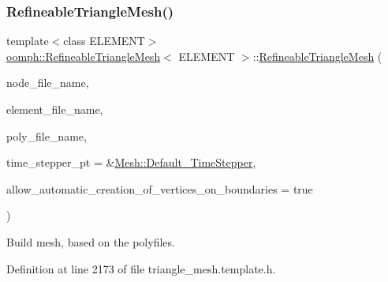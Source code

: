 \subsubsection{\texorpdfstring{Refineable\+Triangle\+Mesh()}{RefineableTriangleMesh()}\hspace{0.1cm}{\footnotesize\ttfamily [2/3]}}
{\footnotesize\ttfamily template$<$class E\+L\+E\+M\+E\+NT$>$ \\
\hyperlink{classoomph_1_1RefineableTriangleMesh}{oomph\+::\+Refineable\+Triangle\+Mesh}$<$ E\+L\+E\+M\+E\+NT $>$\+::\hyperlink{classoomph_1_1RefineableTriangleMesh}{Refineable\+Triangle\+Mesh} (\begin{DoxyParamCaption}\item[{const std\+::string \&}]{node\+\_\+file\+\_\+name,  }\item[{const std\+::string \&}]{element\+\_\+file\+\_\+name,  }\item[{const std\+::string \&}]{poly\+\_\+file\+\_\+name,  }\item[{\hyperlink{classoomph_1_1TimeStepper}{Time\+Stepper} $\ast$}]{time\+\_\+stepper\+\_\+pt = {\ttfamily \&\hyperlink{classoomph_1_1Mesh_a12243d0fee2b1fcee729ee5a4777ea10}{Mesh\+::\+Default\+\_\+\+Time\+Stepper}},  }\item[{const bool \&}]{allow\+\_\+automatic\+\_\+creation\+\_\+of\+\_\+vertices\+\_\+on\+\_\+boundaries = {\ttfamily true} }\end{DoxyParamCaption})\hspace{0.3cm}{\ttfamily [inline]}}



Build mesh, based on the polyfiles. 



Definition at line 2173 of file triangle\+\_\+mesh.\+template.\+h.

\mbox{\label{classoomph_1_1RefineableTriangleMesh_a488004263be96473c332468e13e80a83}} 
